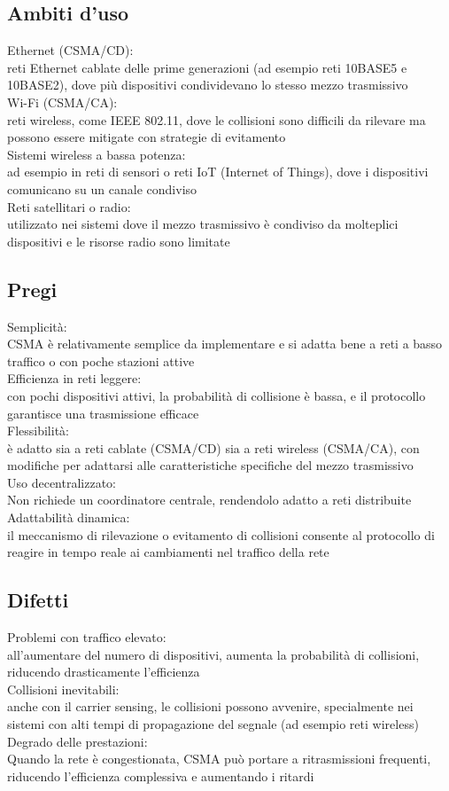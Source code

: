 \documentclass[10pt,oneside,a4paper]{article}
\begin{document}
\subsection{Ambiti d'uso}
Ethernet (CSMA/CD):\\
reti Ethernet cablate delle prime generazioni (ad esempio reti 10BASE5 e 10BASE2), dove più dispositivi condividevano lo stesso mezzo trasmissivo\\
Wi-Fi (CSMA/CA):\\
reti wireless, come IEEE 802.11, dove le collisioni sono difficili da rilevare ma possono essere mitigate con strategie di evitamento\\
Sistemi wireless a bassa potenza:\\
ad esempio in reti di sensori o reti IoT (Internet of Things), dove i dispositivi comunicano su un canale condiviso\\
Reti satellitari o radio:\\
utilizzato nei sistemi dove il mezzo trasmissivo è condiviso da molteplici dispositivi e le risorse radio sono limitate
\subsection{Pregi}
Semplicità:\\
CSMA è relativamente semplice da implementare e si adatta bene a reti a basso traffico o con poche stazioni attive\\
Efficienza in reti leggere:\\
con pochi dispositivi attivi, la probabilità di collisione è bassa, e il protocollo garantisce una trasmissione efficace\\
Flessibilità:\\
è adatto sia a reti cablate (CSMA/CD) sia a reti wireless (CSMA/CA), con modifiche per adattarsi alle caratteristiche specifiche del mezzo trasmissivo\\
Uso decentralizzato:\\
Non richiede un coordinatore centrale, rendendolo adatto a reti distribuite\\
Adattabilità dinamica:\\
il meccanismo di rilevazione o evitamento di collisioni consente al protocollo di reagire in tempo reale ai cambiamenti nel traffico della rete
\subsection{Difetti}
Problemi con traffico elevato:\\
all'aumentare del numero di dispositivi, aumenta la probabilità di collisioni, riducendo drasticamente l'efficienza\\
Collisioni inevitabili:\\
anche con il carrier sensing, le collisioni possono avvenire, specialmente nei sistemi con alti tempi di propagazione del segnale (ad esempio reti wireless)\\
Degrado delle prestazioni:\\
Quando la rete è congestionata, CSMA può portare a ritrasmissioni frequenti, riducendo l'efficienza complessiva e aumentando i ritardi
\end{document}
